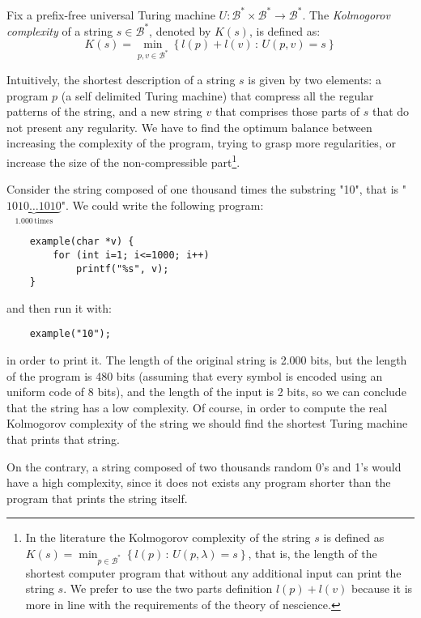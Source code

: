 \begin{definition}
\label{def:Kolmogorov-Complexity}
Fix a prefix-free universal Turing machine $U:\mathcal{B}^\ast \times \mathcal{B}^\ast \rightarrow \mathcal{B}^\ast$. The \emph{Kolmogorov complexity} of a string $s \in \mathcal{B}^\ast$, denoted by $K(s)$, is defined as:
\[
K(s)=\min_{p,v \in \mathcal{B}^\ast}\left\{l(p) + l(v)\,:\, U(p,v)=s\right\}
\]
\end{definition}

Intuitively, the shortest description of a string $s$ is given by two elements: a program $p$ (a self delimited Turing machine) that compress all the regular patterns of the string, and a new string $v$ that comprises those parts of $s$ that do not present any regularity. We have to find the optimum balance between increasing the complexity of the program, trying to grasp more regularities, or increase the size of the non-compressible part\footnote{In the literature the Kolmogorov complexity of the string $s$ is defined as $K(s)=\min_{p \in \mathcal{B}^\ast}\left\{l(p)\,:\, U(p,\lambda)=s\right\}$, that is, the length of the shortest computer program that without any additional input can print the string $s$. We prefer to use the two parts definition $l(p) + l(v)$ because it is more in line with the requirements of the theory of nescience.}.

\begin{example}
Consider the string composed of one thousand times the substring "10", that is "$\underbrace{1010\ldots1010}_{1.000\,\mathrm{times}}$". We could write the following program:

\begin{verbatim}
    example(char *v) {
        for (int i=1; i<=1000; i++)
            printf("%s", v);
    }
\end{verbatim}
and then run it with:
\begin{verbatim}
    example("10");
\end{verbatim}

in order to print it. The length of the original string is 2.000 bits, but the length of the program is 480 bits (assuming that every symbol is encoded using an uniform code of 8 bits), and the length of the input is 2 bits, so we can conclude that the string has a low complexity. Of course, in order to compute the real Kolmogorov complexity of the string we should find the shortest Turing machine that prints that string.

On the contrary, a string composed of two thousands random 0's and 1's would have a high complexity, since it does not exists any program shorter than the program that prints the string itself.
\end{example}

